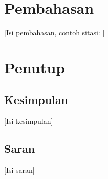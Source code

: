 \documentclass[12pt,a4paper]{article}
\begin{document}
\section{Pembahasan}
[Isi pembahasan, contoh sitasi: \cite{lankton2008introduction}]

\section{Penutup}
\subsection{Kesimpulan}
[Isi kesimpulan]

\subsection{Saran}
[Isi saran]



\end{document}
